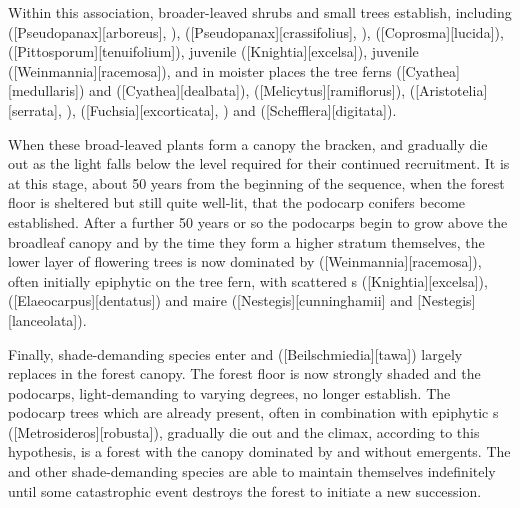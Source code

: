 Within this association, broader-leaved shrubs and small trees establish, including  ([Pseudopanax][arboreus], ),  ([Pseudopanax][crassifolius], ),  ([Coprosma][lucida]),  ([Pittosporum][tenuifolium]), juvenile  ([Knightia][excelsa]), juvenile  ([Weinmannia][racemosa]), and in moister places the tree ferns  ([Cyathea][medullaris]) and  ([Cyathea][dealbata]),  ([Melicytus][ramiflorus]),  ([Aristotelia][serrata], ),  ([Fuchsia][excorticata], ) and  ([Schefflera][digitata]).

When these broad-leaved plants form a canopy the bracken,  and  gradually die out as the light falls below the level required for their continued recruitment.
It is at this stage, about 50 years from the beginning of the sequence, when the forest floor is sheltered but still quite well-lit, that the podocarp conifers become established.
After a further 50 years or so the podocarps begin to grow above the broadleaf canopy and by the time they form a higher stratum themselves, the lower layer of flowering trees is now dominated by  ([Weinmannia][racemosa]), often initially epiphytic on the  tree fern, with scattered s ([Knightia][excelsa]),  ([Elaeocarpus][dentatus]) and maire ([Nestegis][cunninghamii] and [Nestegis][lanceolata]).

Finally, shade-demanding species enter and  ([Beilschmiedia][tawa]) largely replaces  in the forest canopy.
The forest floor is now strongly shaded and the podocarps, light-demanding to varying degrees, no longer establish.
The podocarp trees which are already present, often in combination with epiphytic s ([Metrosideros][robusta]), gradually die out and the climax, according to this hypothesis, is a forest with the canopy dominated by  and without emergents.
The  and other shade-demanding species are able to maintain themselves indefinitely until some catastrophic event destroys the forest to initiate a new succession.

